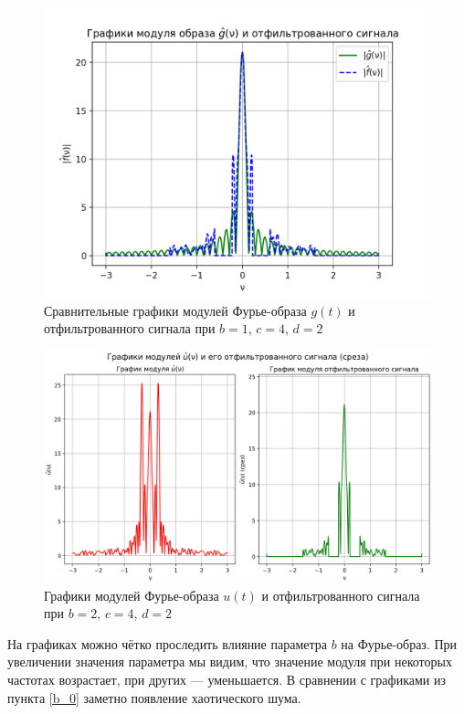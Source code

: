 \begin{figure}[ht!]
    \centering
    \includegraphics[scale=0.55]{media/1 task/specific_freq/Fourier_Image_Comparison_1_4_2_-0,6_-0,22_-2,99_-1,6.png}
    \caption{Сравнительные графики модулей Фурье-образа $g(t)$ и отфильтрованного сигнала при $b=1$,  $c=4$,  $d=2$}
    \label{fig:fourc_1_4_2}
\end{figure}

\begin{figure}[ht!]
    \centering
    \includegraphics[scale=0.55]{media/1 task/specific_freq/Fourier_Image_2_4_2_-0,6_-0,22_-2,99_-1,6.png}
    \caption{Графики модулей Фурье-образа $u(t)$ и отфильтрованного сигнала при $b=2$,  $c=4$,  $d=2$}
    \label{fig:four_2_4_2}
\end{figure}

На графиках можно чётко проследить влияние параметра $b$ на Фурье-образ. При увеличении значения параметра мы видим, что значение модуля при некоторых частотах возрастает, при других --- уменьшается. В сравнении с графиками из пункта \ref{b_0} заметно появление хаотического шума.

